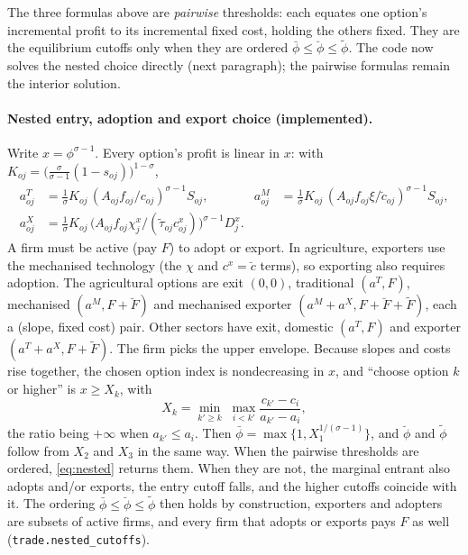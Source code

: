 \documentclass[11pt]{article}
\begin{document}
The three formulas above are \emph{pairwise} thresholds: each equates one option's
incremental profit to its incremental fixed cost, holding the others fixed. They are the
equilibrium cutoffs only when they are ordered $\bar\phi\le\breve\phi\le\tilde\phi$. The code
now solves the nested choice directly (next paragraph); the pairwise formulas remain the
interior solution.

\paragraph{Nested entry, adoption and export choice (implemented).} Write
$x=\phi^{\sigma-1}$. Every option's profit is linear in $x$: with
$K_{oj}=\bigl(\tfrac{\sigma}{\sigma-1}(1-s_{oj})\bigr)^{1-\sigma}$,
\begin{align*}
  a^{T}_{oj} &= \tfrac{1}{\sigma}K_{oj}\,(A_{oj}f_{oj}/c_{oj})^{\sigma-1} S_{oj}, &
  a^{M}_{oj} &= \tfrac{1}{\sigma}K_{oj}\,(A_{oj}f_{oj}\xi/\breve c_{oj})^{\sigma-1} S_{oj}, \\
  a^{X}_{oj} &= \tfrac{1}{\sigma}K_{oj}\,\bigl(A_{oj}f_{oj}\chi^x_j/(\tilde\tau_{oj}c^x_{oj})\bigr)^{\sigma-1} D^{x}_{j}.
\end{align*}
A firm must be active (pay $F$) to adopt or export. In agriculture, exporters use the
mechanised technology (the $\chi$ and $c^x=\breve c$ terms), so exporting also requires
adoption. The agricultural options are exit $(0,0)$, traditional $(a^T,F)$, mechanised
$(a^M,F+\breve F)$ and mechanised exporter $(a^M+a^X,F+\breve F+\tilde F)$, each a (slope,
fixed cost) pair. Other sectors have exit, domestic $(a^T,F)$ and exporter $(a^T+a^X,F+\tilde F)$.
The firm picks the upper envelope. Because slopes and costs rise together, the chosen option
index is nondecreasing in $x$, and ``choose option $k$ or higher'' is $x\ge X_k$, with
\begin{equation}
  X_k=\min_{k'\ge k}\;\max_{i<k'}\frac{c_{k'}-c_i}{a_{k'}-a_i},
  \label{eq:nested}
\end{equation}
the ratio being $+\infty$ when $a_{k'}\le a_i$. Then $\bar\phi=\max\{1,X_1^{1/(\sigma-1)}\}$, and
$\breve\phi$ and $\tilde\phi$ follow from $X_2$ and $X_3$ in the same way. When the pairwise thresholds are
ordered, \eqref{eq:nested} returns them. When they are not, the marginal entrant also adopts
and/or exports, the entry cutoff falls, and the higher cutoffs coincide with it. The ordering
$\bar\phi\le\breve\phi\le\tilde\phi$ then holds by construction, exporters and adopters are subsets of
active firms, and every firm that adopts or exports pays $F$ as well
(\texttt{trade.nested\_cutoffs}).
\end{document}
